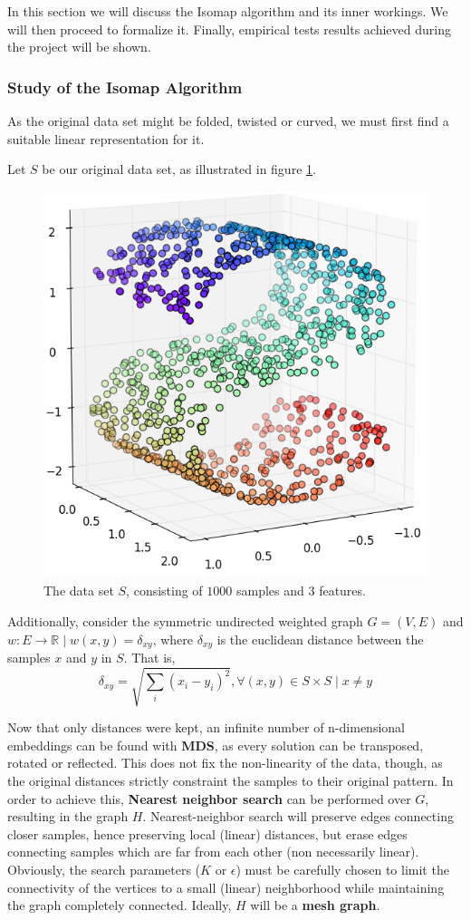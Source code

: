 \documentclass[12pt]{article}
\begin{document}
In this section we will discuss the Isomap algorithm and its inner workings. We will then proceed to formalize it. Finally, empirical tests results achieved during the project will be shown.

\subsubsection{Study of the Isomap Algorithm}

As the original data set might be folded, twisted or curved, \cite{ten2000} we must first find a suitable linear representation for it.

Let $S$ be our original data set, as illustrated in figure \ref{fig:mani_s}.

\begin{figure}[H]
	\centering
	\captionsetup{justification=centering}
	\includegraphics[width=.5\linewidth]{datasets/s}
	\caption{The data set $S$, consisting of $1000$ samples and $3$ features.}
	\label{fig:mani_s}
\end{figure}

Additionally, consider the symmetric undirected weighted graph $G=(V, E)$ and $w \colon E \to \mathbb{R} \mid w(x, y) = \delta_{xy}$, where $\delta_{xy}$ is the euclidean distance between the samples $x$ and $y$ in $S$. That is,
$$\delta_{xy} = \sqrt{\sum_{i} (x_i - y_i)^2}, \forall (x, y) \in S\times S \mid x\ne y$$

Now that only distances were kept, an infinite number of n-dimensional embeddings can be found with \textbf{MDS}, as every solution can be transposed, rotated or reflected. This does not fix the non-linearity of the data, though, as the original distances strictly constraint the samples to their original pattern. In order to achieve this, \textbf{Nearest neighbor search} can be performed over $G$, resulting in the graph $H$. Nearest-neighbor search will preserve edges connecting closer samples, hence preserving local (linear) distances, but erase edges connecting samples which are far from each other (non necessarily linear). Obviously, the search parameters ($K$ or $\epsilon$) must be carefully chosen to limit the connectivity of the vertices to a small (linear) neighborhood while maintaining the graph completely connected. Ideally, $H$ will be a \textbf{mesh graph}.
\end{document}

